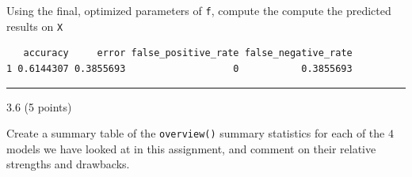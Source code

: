 \documentclass[
  letterpaper,
  DIV=11,
  numbers=noendperiod]{scrartcl}
\newenvironment{Shaded}{\begin{snugshade}}{\end{snugshade}}
\newcommand{\AttributeTok}[1]{\textcolor[rgb]{0.40,0.45,0.13}{#1}}
\newcommand{\CommentTok}[1]{\textcolor[rgb]{0.37,0.37,0.37}{#1}}
\newcommand{\ControlFlowTok}[1]{\textcolor[rgb]{0.00,0.23,0.31}{#1}}
\newcommand{\DecValTok}[1]{\textcolor[rgb]{0.68,0.00,0.00}{#1}}
\newcommand{\FloatTok}[1]{\textcolor[rgb]{0.68,0.00,0.00}{#1}}
\newcommand{\FunctionTok}[1]{\textcolor[rgb]{0.28,0.35,0.67}{#1}}
\newcommand{\NormalTok}[1]{\textcolor[rgb]{0.00,0.23,0.31}{#1}}
\newcommand{\OtherTok}[1]{\textcolor[rgb]{0.00,0.23,0.31}{#1}}
\newcommand{\SpecialCharTok}[1]{\textcolor[rgb]{0.37,0.37,0.37}{#1}}
\newcommand{\StringTok}[1]{\textcolor[rgb]{0.13,0.47,0.30}{#1}}
\begin{document}
Using the final, optimized parameters of \texttt{f}, compute the compute
the predicted results on \texttt{X}

\begin{Shaded}
\end{Shaded}

\begin{verbatim}
   accuracy     error false_positive_rate false_negative_rate
1 0.6144307 0.3855693                   0           0.3855693
\end{verbatim}

\begin{center}\rule{0.5\linewidth}{0.5pt}\end{center}

3.6 (5 points)

Create a summary table of the \texttt{overview()} summary statistics for
each of the \(4\) models we have looked at in this assignment, and
comment on their relative strengths and drawbacks.

\begin{Shaded}
\end{Shaded}
\end{document}
